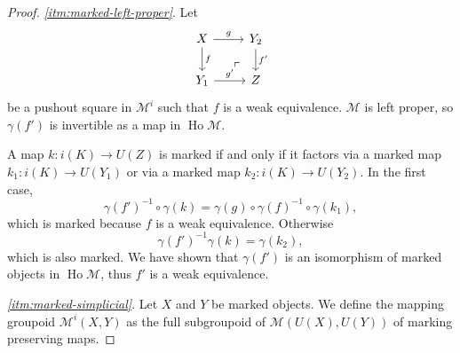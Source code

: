 \documentclass[a4paper]{article}
\theoremstyle{remark}
\theoremstyle{definition}
\begin{document}
\begin{proof}
  \emph{\ref{itm:marked-left-proper}}.
  Let 
  \begin{equation}
    \begin{tikzcd}
      X \arrow[r, "g"] \arrow[d, "f"] \arrow[dr, phantom, near end, "\ulcorner"] & Y_2 \arrow[d, "f'"] \\
      Y_1 \arrow[r, "g'"] & Z
    \end{tikzcd}
  \end{equation}
  be a pushout square in $\mathcal{M}^i$ such that $f$ is a weak equivalence.
  $\mathcal{M}$ is left proper, so $\gamma(f')$ is invertible as a map in $\operatorname{Ho} \mathcal{M}$.

  A map $k : i(K) \rightarrow U(Z)$ is marked if and only if it factors via a marked map $k_1 : i(K) \rightarrow U(Y_1)$ or via a marked map $k_2 : i(K) \rightarrow U(Y_2)$.
  In the first case,
  \begin{equation}
    \gamma(f')^{-1} \circ \gamma(k) = \gamma(g) \circ \gamma(f)^{-1} \circ \gamma(k_1),
  \end{equation}
  which is marked because $f$ is a weak equivalence.
  Otherwise
  \begin{equation}
    \gamma(f')^{-1} \gamma(k) = \gamma(k_2),
  \end{equation}
  which is also marked.
  We have shown that $\gamma(f')$ is an isomorphism of marked objects in $\operatorname{Ho} \mathcal{M}$, thus $f'$ is a weak equivalence.

  \emph{\ref{itm:marked-simplicial}}.
  Let $X$ and $Y$ be marked objects.
  We define the mapping groupoid $\mathcal{M}^i(X, Y)$ as the full subgroupoid of $\mathcal{M}(U(X), U(Y))$ of marking preserving maps.


\end{proof}
\end{document}
